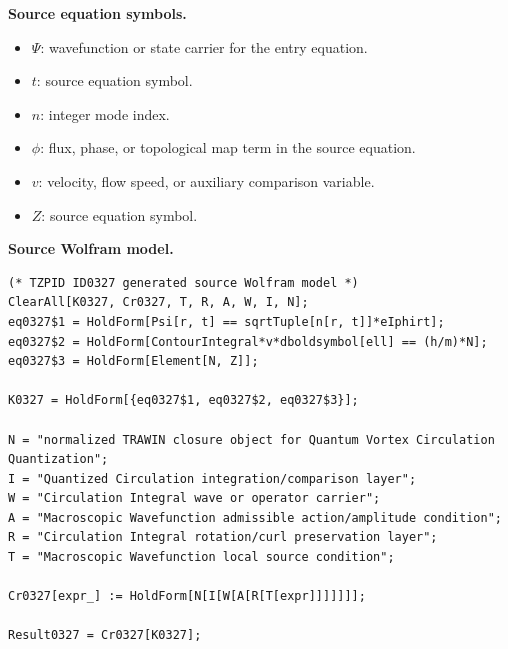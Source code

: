 \begin{minipage}[t]{0.49\linewidth}
\begingroup
\small
\raggedright
\textbf{Source equation symbols.}\par
\begin{itemize}[leftmargin=1.35em,itemsep=1pt,topsep=1pt,parsep=0pt]
    \item $\Psi$: wavefunction or state carrier for the entry equation.
    \item $t$: source equation symbol.
    \item $n$: integer mode index.
    \item $\phi$: flux, phase, or topological map term in the source equation.
    \item $v$: velocity, flow speed, or auxiliary comparison variable.
    \item $Z$: source equation symbol.
\end{itemize}
\endgroup
\end{minipage}\hfill
\begin{minipage}[t]{0.47\linewidth}
\begingroup
\scriptsize
\raggedright
\textbf{Source Wolfram model.}\par
\begin{Verbatim}[fontsize=\tiny,breaklines=true,breakanywhere=true]
(* TZPID ID0327 generated source Wolfram model *)
ClearAll[K0327, Cr0327, T, R, A, W, I, N];
eq0327$1 = HoldForm[Psi[r, t] == sqrtTuple[n[r, t]]*eIphirt];
eq0327$2 = HoldForm[ContourIntegral*v*dboldsymbol[ell] == (h/m)*N];
eq0327$3 = HoldForm[Element[N, Z]];

K0327 = HoldForm[{eq0327$1, eq0327$2, eq0327$3}];

N = "normalized TRAWIN closure object for Quantum Vortex Circulation Quantization";
I = "Quantized Circulation integration/comparison layer";
W = "Circulation Integral wave or operator carrier";
A = "Macroscopic Wavefunction admissible action/amplitude condition";
R = "Circulation Integral rotation/curl preservation layer";
T = "Macroscopic Wavefunction local source condition";

Cr0327[expr_] := HoldForm[N[I[W[A[R[T[expr]]]]]]];

Result0327 = Cr0327[K0327];
\end{Verbatim}
\endgroup
\end{minipage}

